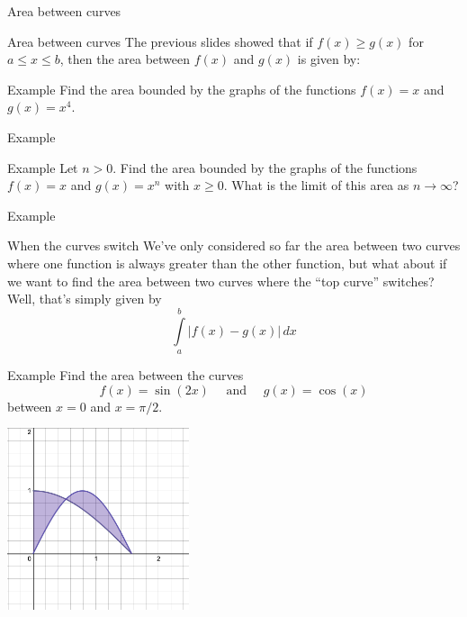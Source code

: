 \documentclass[presentation]{beamer}
\begin{document}
\begin{frame}[label={sec:org6a417df}]{Area between curves}
\end{frame}

\begin{frame}[label={sec:orgb60e791}]{Area between curves}
The previous slides showed that if \(f(x) \ge g(x)\) for \(a \le x
\le b\), then the area between \(f(x)\) and \(g(x)\) is given by:
\vspace{10in}
\end{frame}

\begin{frame}[label={sec:orgee0ad1f}]{Example}
Find the area bounded by the graphs of the functions
\(f(x) = x\) and \(g(x) = x^4\).
\vspace{10in}
\end{frame}

\begin{frame}[label={sec:org16bbf68}]{Example}
\end{frame}

\begin{frame}[label={sec:org6cd989d}]{Example}
Let \(n > 0\).  Find the area bounded by the graphs of the functions
\(f(x) = x\) and \(g (x) = x^n\) with \(x \ge 0\).  What is the limit of this area as
\(n \rightarrow \infty\)?
\vspace{10in}
\end{frame}

\begin{frame}[label={sec:orgb3d7ca9}]{Example}
\end{frame}

\begin{frame}[label={sec:orgf775f96}]{When the curves switch}
We've only considered so far the area between two curves where one
function is always greater than the other function, but what about if
we want to find the area between two curves where the ``top curve''
switches?  Well, that's simply given by
\[
\int\limits_a^b \left| f(x) - g(x) \right|\,dx \]
\end{frame}

\begin{frame}[label={sec:org40dfd6f}]{Example}
Find the area between the curves
\[
f \left( x \right) = \sin \left( 2x \right) \quad \text{ and } \quad g
\left( x \right) = \cos \left( x \right)\]
between \(x = 0\) and \(x = \pi/2\).

\begin{center}
\includegraphics[width=0.4\textwidth]{../img/day004-ex2.png}
\end{center}
\end{frame}
\end{document}
